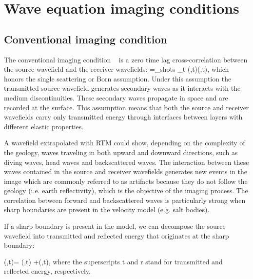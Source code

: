 \section{Wave equation imaging conditions}




\subsection{Conventional imaging condition}
The conventional imaging condition ~\citep{Claerbout:1985:IEI:3887}
is a zero time lag cross-correlation between the source wavefield and the 
receiver wavefields:
%
\beq
\R=\sum_{shots} \sum_{t} \US(\xx,t)\UR(\xx,t),
\label{eq:cic}
\eeq
%
which honors the single scattering or Born assumption. Under this assumption the transmitted
source wavefield generates secondary waves as it interacts with the medium discontinuities. These secondary waves propagate in 
space and are recorded at the surface. This assumption means that both the source and receiver
wavefields carry only transmitted energy through interfaces between layers with different elastic properties.

A wavefield extrapolated with RTM could show, depending on the complexity of the geology, waves traveling in both
upward and downward directions, such as diving waves, head waves and backscattered waves. The interaction between
 these waves contained in the source and receiver wavefields generates new events in the image which are 
commonly referred to as artifacts because they do not follow the geology (i.e. earth reflectivity), which is the objective 
of the imaging process. The correlation between forward and backscattered waves is particularly strong when
sharp boundaries are present in the velocity model (e.g. salt bodies).

If a sharp boundary is present in the model, we can decompose the source wavefield into transmitted 
 and reflected energy that originates at the sharp boundary:

\beq
\US(\xx,t)= \USr(\xx,t) +\USt(\xx,t),
\label{eq:ssplit}
\eeq
%
where the superscripts t and r stand for transmitted and reflected energy, respectively. 

